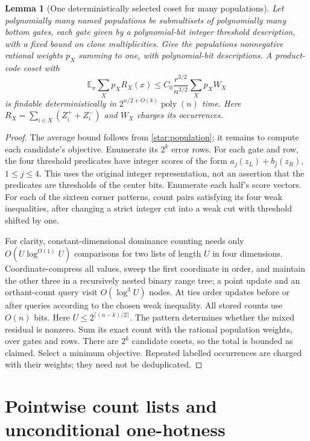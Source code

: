 \documentclass[11pt,letterpaper]{article}
\newtheorem{lemma}[theorem]{Lemma}
\theoremstyle{definition}
\theoremstyle{remark}
\newcommand{\E}{\mathbb E}
\newcommand{\poly}{\operatorname{poly}}
\begin{document}
\begin{lemma}[One deterministically selected coset for many populations]
\label{star:selection}
Let polynomially many named populations be submultisets of polynomially
many bottom gates, each gate given by a polynomial-bit integer
threshold description, with a fixed bound on clone multiplicities. Give the
populations nonnegative rational weights $p_X$ summing to one, with
polynomial-bit descriptions. A product-code coset with
\[
\E_x\sum_Xp_X R_X(x)
\le C_0\frac{r^{3/2}}{n^{3/2}}\sum_Xp_XW_X
\]
is findable deterministically in $2^{n/2+O(k)}\poly(n)$ time. Here
$R_X=\sum_{i\in X}(Z_i^++Z_i^-)$ and $W_X$ charges its occurrences.
\end{lemma}
\begin{proof}
The average bound follows from \cref{star:population}; it remains to
compute each candidate's objective. Enumerate its $2^k$ error rows.
For each gate and row, the four threshold predicates have integer scores
of the form $a_j(z_L)+b_j(z_R)$, $1\le j\le4$.
This uses the original integer representation, not an assertion that the
predicates are thresholds of the center bits. Enumerate each half's score
vectors. For each of the sixteen corner patterns, count pairs satisfying
its four weak inequalities, after changing a strict integer cut into a
weak cut with threshold shifted by one.

For clarity, constant-dimensional dominance counting needs only
$O(U\log^{O(1)}U)$ comparisons for two lists of length $U$ in four
dimensions. Coordinate-compress all values, sweep the first coordinate
in order, and maintain the other three in a recursively nested binary
range tree; a point update and an orthant-count query visit
$O(\log^3 U)$ nodes. At ties order updates before or after queries
according to the chosen weak inequality. All stored counts use
$O(n)$ bits. Here $U\le2^{\lceil(n-k)/2\rceil}$.
The pattern determines whether the mixed residual is nonzero.
Sum its exact count with the rational population weights, over gates
and rows. There are $2^k$ candidate cosets, so the total is bounded as
claimed. Select a minimum objective. Repeated labelled occurrences are
charged with their weights; they need not be deduplicated.
\end{proof}

\section{Pointwise count lists and unconditional one-hotness}
\label{list:appendix}
\end{document}
